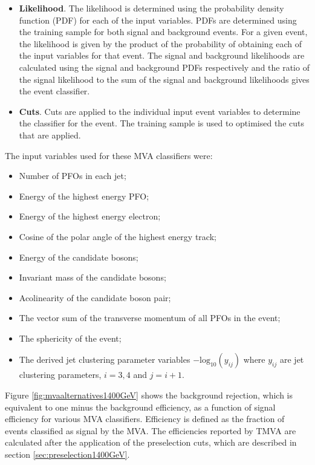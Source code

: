 \begin{itemize}
\item \textbf{Likelihood}.  The likelihood is determined using the probability density function (PDF) for each of the input variables.  PDFs are determined using the training sample for both signal and background events.  For a given event, the likelihood is given by the product of the probability of obtaining each of the input variables for that event.  The signal and background likelihoods are calculated using the signal and background PDFs respectively and the ratio of the signal likelihood to the sum of the signal and background likelihoods gives the event classifier.   
\item \textbf{Cuts}.  Cuts are applied to the individual input event variables to determine the classifier for the event.  The training sample is used to optimised the cuts that are applied.
\end{itemize}

The input variables used for these MVA classifiers were:
\begin{itemize}
\item Number of PFOs in each jet;
\item Energy of the highest energy PFO;
\item Energy of the highest energy electron;
\item Cosine of the polar angle of the highest energy track;
\item Energy of the candidate bosons;
\item Invariant mass of the candidate bosons;
\item Acolinearity of the candidate boson pair;
\item The vector sum of the transverse momentum of all PFOs in the event;
\item The sphericity of the event;
\item The derived jet clustering parameter variables $-\text{log}_{10}(y_{ij})$ where $y_{ij}$ are jet clustering parameters, $i = 3,4$ and $j=i+1$.  
\end{itemize}

Figure \ref{fig:mvaalternatives1400GeV} shows the background rejection, which is equivalent to one minus the background efficiency, as a function of signal efficiency for various MVA classifiers.  Efficiency is defined as the fraction of events classified as signal by the MVA.  The efficiencies reported by TMVA are calculated after the application of the preselection cuts, which are described in section \ref{sec:preselection1400GeV}.  

